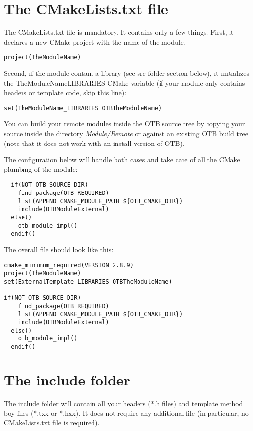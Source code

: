\section{The CMakeLists.txt file}

The CMakeLists.txt file is mandatory. It contains only a few things.
First, it declares a new CMake project with the name of the module. 

\begin{verbatim}
project(TheModuleName)
\end{verbatim}

Second, if the module contain a library (see src folder section below), it initializes the TheModuleName\textunderscore LIBRARIES CMake variable (if your module only contains headers or template code, skip this line): 

\begin{verbatim}
set(TheModuleName_LIBRARIES OTBTheModuleName)
\end{verbatim}

You can build your remote modules inside the OTB source tree by copying your
source inside the directory \textit{Module/Remote} or against an existing OTB
build tree (note that it does not work with an install version of OTB). 

The configuration below will handle both cases and take care of all the CMake
plumbing of the module:

\begin{verbatim}
  if(NOT OTB_SOURCE_DIR)
    find_package(OTB REQUIRED)
    list(APPEND CMAKE_MODULE_PATH ${OTB_CMAKE_DIR})
    include(OTBModuleExternal)
  else()
    otb_module_impl()
  endif()
\end{verbatim}

The overall file should look like this:
 
\begin{verbatim}
cmake_minimum_required(VERSION 2.8.9)
project(TheModuleName)
set(ExternalTemplate_LIBRARIES OTBTheModuleName)

if(NOT OTB_SOURCE_DIR)
    find_package(OTB REQUIRED)
    list(APPEND CMAKE_MODULE_PATH ${OTB_CMAKE_DIR})
    include(OTBModuleExternal)
  else()
    otb_module_impl()
  endif()
\end{verbatim}

\section{The include folder}

The include folder will contain all your headers (*.h files) and template method boy files (*.txx or *.hxx). It does not require any additional file (in particular, no CMakeLists.txt file is required). 

